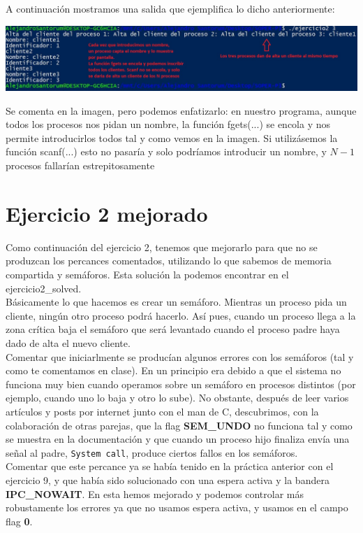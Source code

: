 \documentclass[12pt]{article}
\begin{document}
A continuación mostramos una salida que ejemplifica lo dicho anteriormente:
\begin{center}
	\includegraphics[scale=0.86]{ej2.JPG}
\end{center}
Se comenta en la imagen, pero podemos enfatizarlo: en nuestro programa, aunque todos los procesos nos pidan un nombre, la función fgets(...) se encola y nos permite introducirlos todos tal y como vemos en la imagen. Si utilizásemos la función scanf(...) esto no pasaría y solo podríamos introducir un nombre, y $N-1$ procesos fallarían estrepitosamente

\section{Ejercicio 2 mejorado}
Como continuación del ejercicio 2, tenemos que mejorarlo para que no se produzcan los percances comentados, utilizando lo que sabemos de memoria compartida y semáforos. Esta solución la podemos encontrar en el ejercicio2\_solved.\\

Básicamente lo que hacemos es crear un semáforo. Mientras un proceso pida un cliente, ningún otro proceso podrá hacerlo. Así pues, cuando un proceso llega a la zona crítica baja el semáforo que será levantado cuando el proceso padre haya dado de alta el nuevo cliente.\\

Comentar que iniciarlmente se producían algunos errores con los semáforos (tal y como te comentamos en clase). En un principio era debido a que el sistema no funciona muy bien cuando operamos sobre un semáforo en procesos distintos (por ejemplo, cuando uno lo baja y otro lo sube). No obstante, después de leer varios artículos y posts por internet junto con el man de C, descubrimos, con la colaboración de otras parejas, que la flag \textbf{SEM\_UNDO} no funciona tal y como se muestra en la documentación y que cuando un proceso hijo finaliza envía una señal al padre, \texttt{System call}, produce ciertos fallos en los semáforos. \\

Comentar que este percance ya se había tenido en la práctica anterior con el ejercicio 9, y que había sido solucionado con una espera activa y la bandera \textbf{IPC\_NOWAIT}. En esta hemos mejorado y podemos controlar más robustamente los errores ya que no usamos espera activa, y usamos en el campo flag \textbf{0}.\\
\end{document}
